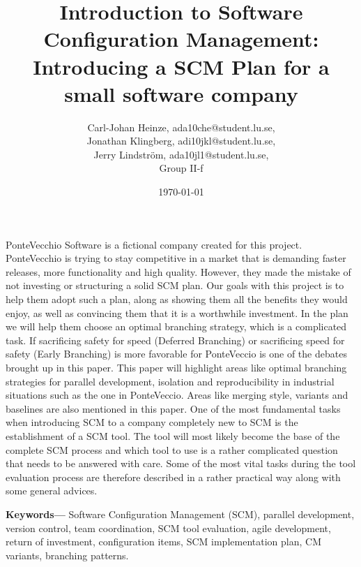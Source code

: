 \documentclass[10pt]{article}
\renewenvironment{abstract}
  {\small\quotation
  {\bfseries\noindent{\large\abstractname}\par\nobreak\smallskip}}
  {\endquotation}
\providecommand{\keywords}[1]{\textbf{{Keywords---}} #1}
\begin{document}
\makeatletter
\renewcommand{\@biblabel}[1]{\quad#1.}
\makeatother


\pagestyle{myheadings}


\begin{titlepage}
\title{Introduction to Software Configuration Management:
\\Introducing a SCM Plan for a small software company}
\author{Carl-Johan Heinze, ada10che@student.lu.se,  
\\Jonathan Klingberg, adi10jkl@student.lu.se, 
\\Jerry Lindström, ada10jl1@student.lu.se,
\\Group II-f}
\date{\today}
\maketitle
\thispagestyle{empty}
\end{titlepage}

\tableofcontents
\thispagestyle{empty}
\newpage
{}

\begin{abstract}
\noindent PonteVecchio Software is a fictional company created for this project. PonteVecchio is trying to stay competitive in a market that is demanding faster releases, more functionality and high quality. However, they made the mistake of not investing or structuring a solid SCM plan. Our goals with this project is to help them adopt such a plan, along as showing them all the benefits they would enjoy, as well as convincing them that it is a worthwhile investment.
\noindent In the plan we will help them choose an optimal branching strategy, which is a complicated task. If sacrificing safety for speed (Deferred Branching) or sacrificing speed for safety (Early Branching) is more favorable for PonteVeccio is one of the debates brought up in this paper. This paper will highlight areas like optimal branching strategies for parallel development, isolation and reproducibility in industrial situations such as the one in PonteVeccio. Areas like merging style, variants and baselines are also mentioned in this paper.
\noindent One of the most fundamental tasks when introducing SCM to a company completely new to SCM is the establishment of a SCM tool. The tool will most likely become the base of the complete SCM process and which tool to use is a rather complicated question that needs to be answered with care. Some of the most vital tasks during the tool evaluation process are therefore described in a rather practical way along with some general advices.


\end{abstract}
\keywords{Software Configuration Management (SCM), parallel development, version control, team coordination, SCM tool evaluation, agile development, return of investment, configuration items, SCM implementation plan, CM variants, branching patterns.}
\end{document}
